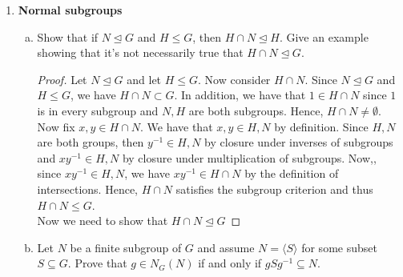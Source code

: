 \documentclass[11pt, reqno]{amsart}
\theoremstyle{plain}
\theoremstyle{definition}
\theoremstyle{example}
\newenvironment{ans}{\color{black}\medskip \paragraph*{\emph{Answer}.}}{\hfill \break  $~\!\!$ \dotfill \medskip }
\def\GL{\mathrm{GL}} \def\SL{\mathrm{SL}}  \def\SP{\mathrm{SL}}
\def\<{\langle} \def\>{\rangle}
\def\normeq{\unlhd}
\begin{document}
\begin{enumerate}[1.]
\begin{enumerate}[(a)]
\newpage
\item Show $\SL_n(F) \normeq \GL_n(F)$, and describe $\GL_n(F)/\SL_n(F)$.\\
{\small[Hint: What homomorphism out of $\GL_n(F)$ is $\SL_n(F)$ the kernel of? Use the 1st isomorphism thm.]}
\begin{ans}
Note that,
\begin{align*}
\GL_n(F) = \{A: A \; \text{is an} \; n \times n \; \text{matrix with entries from} \; F \; \text{and} \; \det(A) \neq 0\}
\end{align*}

where $F$ is a field. We also have,
\begin{align*}
\SL_n(F) = \{A \in \GL_n(F): \det(A) = 1\}
\end{align*}
\end{ans}

\item If $N \normeq G$, we know $G/N$ is a group. Is it necessarily true that $G/N$ is isomorphic to a subgroup of $G$? If yes, prove it; if no, give a counterexample. 
\end{enumerate}


\item {\bf Normal subgroups}
\begin{enumerate}[(a)]
\item Show that if $N \normeq G$ and $H \le G$, then $H \cap N \normeq H$. Give an example showing that it's not necessarily true that $H \cap N \normeq G$.
\begin{proof}
Let $N \normeq G$ and let $H \le G$. Now consider $H \cap N$. Since $N \normeq G$ and $H \le G$, we have $H \cap N \subset G$. In addition, we have that $1 \in H \cap N$ since $1$ is in every subgroup and $N, H$ are both subgroups. Hence, $H \cap N \neq \emptyset$.\\

Now fix $x, y \in H \cap N$. We have that $x, y \in H, N$ by definition. Since $H, N$ are both groups, then $y^{-1} \in H, N$ by closure under inverses of subgroups and $xy^{-1} \in H, N$ by closure under multiplication of subgroups. Now,, since $xy^{-1} \in H, N$, we have $xy^{-1} \in H \cap N$ by the definition of intersections. Hence, $H \cap N$ satisfies the subgroup criterion and thus $H \cap N \leq G$.\\

Now we need to show that $H \cap N \normeq G$
\end{proof}
\item Let $N$ be a finite subgroup of $G$ and assume $N = \<S\>$ for some subset $S \subseteq G$. Prove that $g \in N_G(N) $ if and only if $g S g^{-1} \subseteq N$. 
\end{enumerate}



\end{enumerate}
\end{document}
